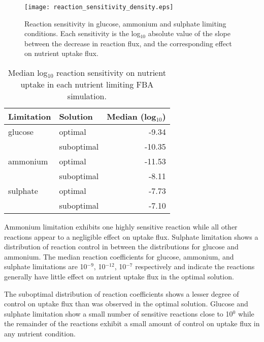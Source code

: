 \begin{figure}%
  \centering
  \texttt{[image: reaction\_sensitivity\_density.eps]}
  \caption[Reaction sensitivity in glucose, ammonium and sulphate limitation]{Reaction sensitivity in glucose, ammonium and sulphate limiting conditions. Each sensitivity is the log$_{10}$ absolute value of the slope between the decrease in reaction flux, and the corresponding effect on nutrient uptake flux. }
  \label{figure:sensitivity_density}
\end{figure}%

\begin{table}%
  \centering
  \begin{tabular}{l l r}
                                                    \toprule
    Limitation  & Solution   & Median (log$_{10}$) \\ \midrule
    glucose     & optimal    &  -9.34            \\
                & suboptimal & -10.35            \\
    ammonium    & optimal    & -11.53            \\
                & suboptimal &  -8.11            \\
    sulphate    & optimal    &  -7.73            \\
                & suboptimal &  -7.10            \\ \bottomrule
  \end{tabular}
  \caption[Median log$_10$ reaction sensitivities]{Median log$_{10}$ reaction sensitivity on nutrient uptake in each nutrient limiting FBA simulation. }
  \label{table:median_sensitivity}
\end{table}%

Ammonium limitation exhibits one highly sensitive reaction while all other reactions appear to a negligible effect on uptake flux. Sulphate limitation shows a distribution of reaction control in between the distributions for glucose and ammonium. The median reaction coefficients for glucose, ammonium, and sulphate limitations are 10$^{-9}$, 10$^{-12}$, 10$^{-7}$ respectively and indicate the reactions generally have little effect on nutrient uptake flux in the optimal solution.

The suboptimal distribution of reaction coefficients shows a lesser degree of control on uptake flux than was observed in the optimal solution. Glucose and sulphate limitation show a small number of sensitive reactions close to 10$^0$ while the remainder of the reactions exhibit a small amount of control on uptake flux in any nutrient condition.

